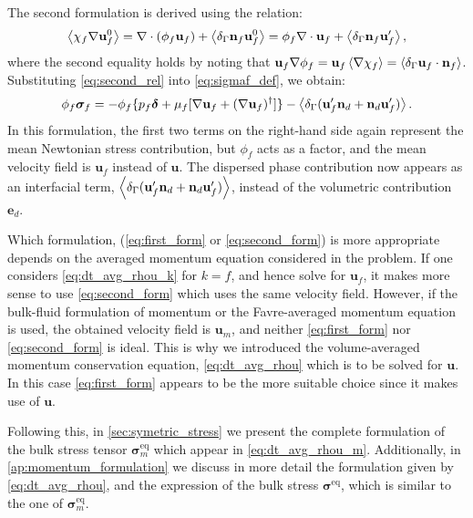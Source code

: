 The second formulation is derived using the relation: 
\begin{equation}
    \avg{\chi_f \grad \textbf{u}_f^0}
    = 
    \div (\phi_f \textbf{u}_f)
    + \avg{\delta_\Gamma \textbf{n}_f \textbf{u}_f^0}
    = 
    \phi_f \div  \textbf{u}_f
    + \avg{\delta_\Gamma \textbf{n}_f \textbf{u}_f'},
    \label{eq:second_rel}
\end{equation}
where the second equality holds by noting that $\textbf{u}_f \mathbf{\nabla} \phi_f =\textbf{u}_f \left<\mathbf{\nabla} \chi_f\right> =\left<\delta_\Gamma \textbf{u}_f \cdot \textbf{n}_f\right>$. 
Substituting \eqref{eq:second_rel} into \eqref{eq:sigmaf_def}, we obtain: 
\begin{equation}
    \phi_f\bm\sigma_f
    = 
    -\phi_f \{
        p_f \bm\delta 
        + \mu_f [\grad \textbf{u}_f + (\grad \textbf{u}_f)^\dagger] 
    \}
    - \avg{\delta_\Gamma (\textbf{u}_f'\textbf{n}_d + \textbf{n}_d \textbf{u}_f')}. 
    \label{eq:second_form}
\end{equation}
In this formulation, the first two terms on the right-hand side again represent the mean Newtonian stress contribution, but $\phi_f$ acts as a factor, and the mean velocity field is $\textbf{u}_f$ instead of $\textbf{u}$. 
The dispersed phase contribution now appears as an interfacial term, $\left<\delta_\Gamma (\textbf{u}_f'\textbf{n}_d + \textbf{n}_d \textbf{u}_f')\right>$, instead of the volumetric contribution $\textbf{e}_d$. 

Which formulation, (\ref{eq:first_form} or \ref{eq:second_form}) is more appropriate depends on the averaged momentum equation considered in the problem.  
If one considers \ref{eq:dt_avg_rhou_k} for $k=f$, and hence solve for $\textbf{u}_f$, it makes more sense to use \ref{eq:second_form} which uses the same velocity field.
However, if the bulk-fluid formulation of momentum or the Favre-averaged momentum equation is used, the obtained velocity field is $\textbf{u}_m$, and neither \ref{eq:first_form} nor \ref{eq:second_form} is ideal. 
This is why we introduced the volume-averaged momentum conservation equation, \eqref{eq:dt_avg_rhou} which is to be solved for $\textbf{u}$. 
In this case \ref{eq:first_form} appears to be the more suitable choice since it makes use of $\textbf{u}$. 


Following this, in \ref{sec:symetric_stress} we present the complete formulation of the bulk stress tensor $\bm\sigma_m^\text{eq}$ which appear in \ref{eq:dt_avg_rhou_m}. 
Additionally, in \ref{ap:momentum_formulation} we discuss in more detail the formulation given by \ref{eq:dt_avg_rhou}, and the expression of the bulk stress $\bm\sigma^\text{eq}$, which is similar to the one of $\bm\sigma_m^\text{eq}$. 